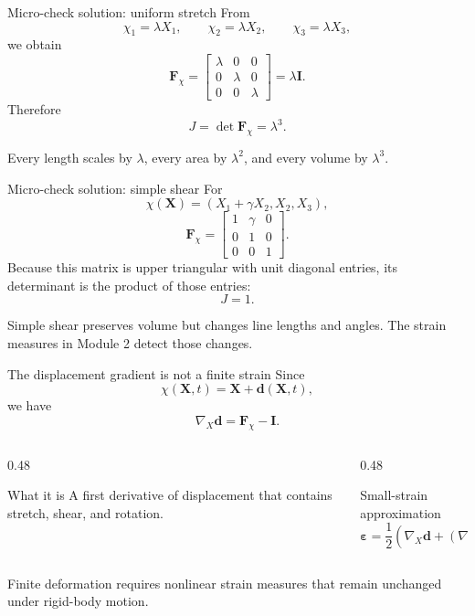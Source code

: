 \documentclass[aspectratio=169,11pt]{beamer}
\newcommand{\X}{\bm{X}}
\newcommand{\I}{\bm{I}}
\newcommand{\Fdef}{\bm{F}_{\chi}}
\newcommand{\gradX}{\nabla_{\!X}}
\begin{document}
\begin{frame}{Micro-check solution: uniform stretch}
From
\[
  \chi_1=\lambda X_1,\qquad
  \chi_2=\lambda X_2,\qquad
  \chi_3=\lambda X_3,
\]
we obtain
\[
  \Fdef
  =
  \begin{bmatrix}
    \lambda&0&0\\
    0&\lambda&0\\
    0&0&\lambda
  \end{bmatrix}
  =\lambda\I .
\]
Therefore
\[
  \boxed{J=\det\Fdef=\lambda^3}.
\]
\begin{punchbox}
\small
Every length scales by \(\lambda\), every area by \(\lambda^2\), and every volume by \(\lambda^3\).
\end{punchbox}
\end{frame}

\begin{frame}{Micro-check solution: simple shear}
For
\[
  \chi(\X)
  =
  (X_1+\gamma X_2,X_2,X_3),
\]
\[
  \Fdef
  =
  \begin{bmatrix}
    1&\gamma&0\\
    0&1&0\\
    0&0&1
  \end{bmatrix}.
\]
Because this matrix is upper triangular with unit diagonal entries, its determinant is the product of those entries:
\[
  \boxed{J=1}.
\]
\begin{punchbox}
\small
Simple shear preserves volume but changes line lengths and angles. The strain measures in Module 2 detect those changes.
\end{punchbox}
\end{frame}

\begin{frame}{The displacement gradient is not a finite strain}
Since
\[
  \chi(\X,t)=\X+\bm{d}(\X,t),
\]
we have
\[
  \gradX\bm{d}=\Fdef-\I .
\]
\begin{columns}[T,onlytextwidth]
\begin{column}{0.48\textwidth}
\begin{block}{What it is}
A first derivative of displacement that contains stretch, shear, and rotation.
\end{block}
\end{column}
\begin{column}{0.48\textwidth}
\begin{block}{Small-strain approximation}
\[
  \bm{\varepsilon}
  =\frac12\left(
    \gradX\bm{d}
    +(\gradX\bm{d})^T
  \right).
\]
\end{block}
\end{column}
\end{columns}
\medskip
\begin{punchbox}
\small
Finite deformation requires nonlinear strain measures that remain unchanged under rigid-body motion.
\end{punchbox}
\end{frame}
\end{document}
